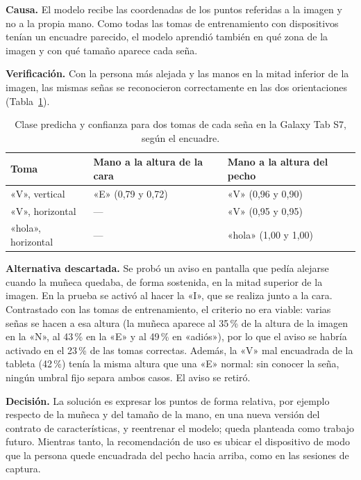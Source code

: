 \textbf{Causa.} El modelo recibe las coordenadas de los puntos referidas a la imagen y no a la propia mano. Como todas las tomas de entrenamiento con dispositivos tenían un encuadre parecido, el modelo aprendió también en qué zona de la imagen y con qué tamaño aparece cada seña.

\textbf{Verificación.} Con la persona más alejada y las manos en la mitad inferior de la imagen, las mismas señas se reconocieron correctamente en las dos orientaciones (Tabla~\ref{tab:encuadre}).

\begin{table}[h]
    \centering
    \begin{tabular}{lll}
        \toprule
        Toma & Mano a la altura de la cara & Mano a la altura del pecho \\
        \midrule
        «V», vertical & «E» (0,79 y 0,72) & «V» (0,96 y 0,90) \\
        «V», horizontal & --- & «V» (0,95 y 0,95) \\
        «hola», horizontal & --- & «hola» (1,00 y 1,00) \\
        \bottomrule
    \end{tabular}
    \caption{Clase predicha y confianza para dos tomas de cada seña en la Galaxy Tab S7, según el encuadre.}
    \label{tab:encuadre}
\end{table}

\textbf{Alternativa descartada.} Se probó un aviso en pantalla que pedía alejarse cuando la muñeca quedaba, de forma sostenida, en la mitad superior de la imagen. En la prueba se activó al hacer la «I», que se realiza junto a la cara. Contrastado con las tomas de entrenamiento, el criterio no era viable: varias señas se hacen a esa altura (la muñeca aparece al 35\,\% de la altura de la imagen en la «N», al 43\,\% en la «E» y al 49\,\% en «adiós»), por lo que el aviso se habría activado en el 23\,\% de las tomas correctas. Además, la «V» mal encuadrada de la tableta (42\,\%) tenía la misma altura que una «E» normal: sin conocer la seña, ningún umbral fijo separa ambos casos. El aviso se retiró.

\textbf{Decisión.} La solución es expresar los puntos de forma relativa, por ejemplo respecto de la muñeca y del tamaño de la mano, en una nueva versión del contrato de características, y reentrenar el modelo; queda planteada como trabajo futuro. Mientras tanto, la recomendación de uso es ubicar el dispositivo de modo que la persona quede encuadrada del pecho hacia arriba, como en las sesiones de captura.

